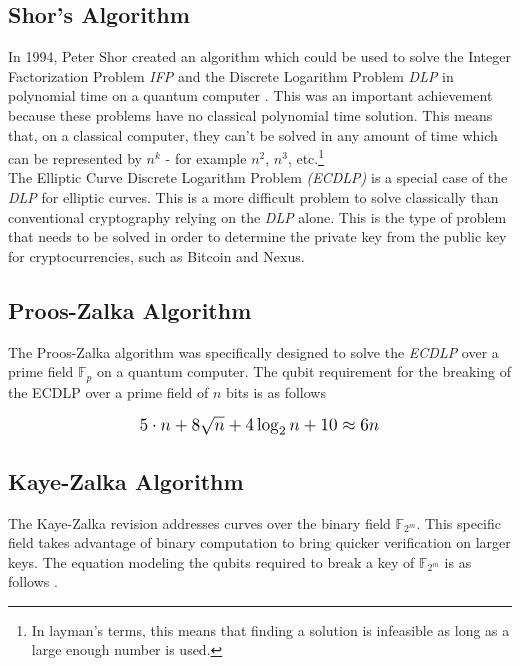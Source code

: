 \documentclass[11pt]{article}
\begin{document}
\subsection{Shor's Algorithm}

\noindent In 1994, Peter Shor created an algorithm which could be used to solve the Integer Factorization Problem \textit{IFP} and the Discrete Logarithm Problem \textit{DLP} in polynomial time on a quantum computer \cite{shorarxiv}.
This was an important achievement because these problems have no classical polynomial time solution.
This means that, on a classical computer, they can't be solved in any amount of time which can be represented by $n^k$ - for example $n^2$, $n^3$, etc.\footnote{In layman's terms, this means that finding a solution is infeasible as long as a large enough number is used.}\\ 

\noindent The Elliptic Curve Discrete Logarithm Problem \textit{(ECDLP)} is a special case of the \textit{DLP} for elliptic curves.
This is a more difficult problem to solve classically than conventional cryptography relying on the \textit{DLP} alone.\cite{prooszalka} %
This is the type of problem that needs to be solved in order to determine the private key from the public key for cryptocurrencies, such as Bitcoin and Nexus.\\

\subsection{Proos-Zalka Algorithm}

The Proos-Zalka algorithm was specifically designed to solve the \textit{ECDLP} over a prime field $\mathbb{F}_p$ on a quantum computer.
The qubit requirement for the breaking of the ECDLP over a prime field of $n$ bits is as follows \cite{prooszalka}

\begin{equation}
\resizebox{.5\hsize}{!}{$5\cdot n + 8 \sqrt{n} + 4 \log_{2} n + 10 \approx 6n$}
\end{equation}

\subsection{Kaye-Zalka Algorithm}
The Kaye-Zalka revision addresses curves over the binary field $\mathbb{F}_{2^m}$. This specific field takes advantage of binary computation to bring quicker verification on larger keys. The equation modeling the qubits required to break a key of $\mathbb{F}_{2^m}$ is as follows \cite{kayezalka}.
\end{document}
